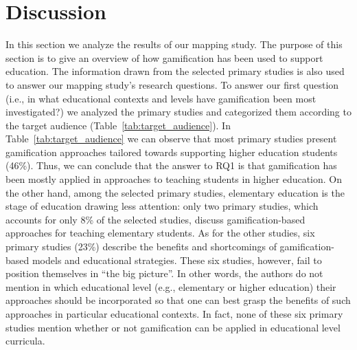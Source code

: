 \section{Discussion} 

In this section we analyze the results of our mapping study. The
purpose of this section is to give an overview of how gamification
has been used to support education. The information drawn from
the selected primary studies is also used to answer our mapping
study's research questions.
To answer our first question (i.e., in what educational contexts and
levels have gamification been most investigated?) we analyzed the
primary studies and categorized them according to the target
audience (Table~\ref{tab:target_audience}). In Table~\ref{tab:target_audience} we can observe that most primary
studies present gamification approaches tailored towards
supporting higher education students (46\%). Thus, we can conclude
that the answer to RQ1 is that gamification has been mostly applied
in approaches to teaching students in higher education. On the other
hand, among the selected primary studies, elementary education is
the stage of education drawing less attention: only two primary
studies, which accounts for only 8\% of the selected studies, discuss
gamification-based approaches for teaching elementary students.
As for the other studies, six primary studies (23\%) describe the
benefits and shortcomings of gamification-based models and
educational strategies. These six studies, however, fail to position
themselves in “the big picture”. In other words, the authors do not
mention in which educational level (e.g., elementary or higher
education) their approaches should be incorporated so that one can
best grasp the benefits of such approaches in particular educational
contexts. In fact, none of these six primary studies mention whether
or not gamification can be applied in educational level curricula.
 
